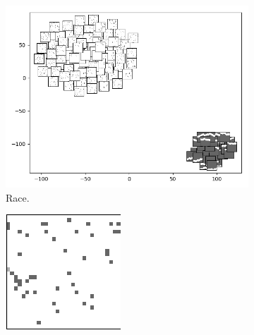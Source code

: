 \begin{figure}[ht!]
	\centering
	\begin{subfigure}{0.24\columnwidth}
		\centering
		\includegraphics[width=\linewidth]{documentation/report/img/scroller_state.png}
		\caption{Race.}
		\label{subfig:race}
	\end{subfigure}%
	\begin{subfigure}{0.24\columnwidth}
		\centering
		\includegraphics[width=\linewidth]{documentation/report/img/evasion.png}

\end{subfigure}
\end{figure}
